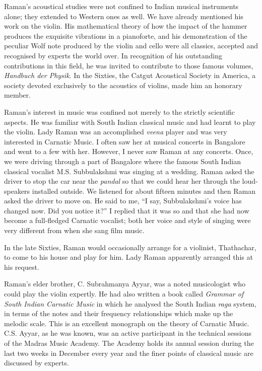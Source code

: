 Raman's acoustical studies were not confined to Indian musical instruments alone; they extended to Western ones as well. We have already mentioned his work on the violin. His mathematical theory of how the impact of the hammer produces the exquisite vibrations in a pianoforte, and his demonstration of the peculiar Wolf note produced by the violin and cello were all classics, accepted and recognised by experts the world over. In recognition of his outstanding contributions in this field, he was invited to contribute to those famous volumes, {\em Handbuch der Physik}. In the Sixties, the Catgut Acoustical Society in America, a society devoted exclusively to the acoustics of violins, made him an honorary member.

Raman's interest in music was confined not merely to the strictly scientific aspects. He was familiar with South Indian classical music and had learnt to play the violin. Lady Raman was an accomplished {\em veena} player and was very interested in Carnatic Music. I often saw her at musical concerts in Bangalore and went to a few with her. However, I never saw Raman at any concerts. Once, we were driving through a part of Bangalore where the famous South Indian classical vocalist M.S. Subbulakshmi was singing at a wedding. Raman asked the driver to stop the car near the {\em pandal} so that we could hear her through the loud-speakers installed outside. We listened for about fifteen minutes and then Raman asked the driver to move on. He said to me, ``I say, Subbulakshmi's voice has changed now. Did you notice it?'' I replied that it was so and that she had now become a full-fledged Carnatic vocalist; both her voice and style of singing were very different from when she sang film music.

In the late Sixties, Raman would occasionally arrange for a violinist, Thathachar, to come to his house and play for him. Lady Raman apparently arranged this at his request.

Raman's elder brother, C. Subrahmanya Ayyar, was a noted musicologist who could play the violin expertly. He had also written a book called {\em Grammar of South Indian Carnatic Music} in which he analysed the South Indian {\em raga} system, in terms of the notes and their frequency relationships which make up the melodic scale. This is an excellent monograph on the theory of Carnatic Music. C.S. Ayyar, as he was known, was an active participant in the technical sessions of the Madras Music Academy. The Academy holds its annual session during the last two weeks in December every year and the finer points of classical music are discussed by experts.

